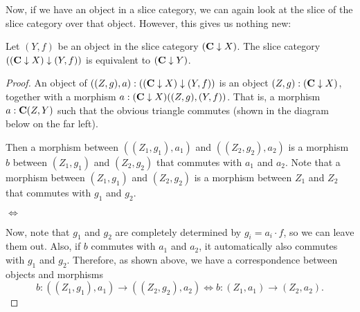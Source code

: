 Now, if we have an object in a slice category, we can again look at the slice of the slice category over that object. However, this gives us nothing new:
\begin{lemma}
  Let $ (Y, f) $ be an object in the slice category $ (\mathbf{C} \downarrow X) $. The slice category $ ((\mathbf{C} \downarrow X) \downarrow (Y, f)) $ is equivalent to $ (\mathbf{C} \downarrow Y) $.
\end{lemma}
\begin{proof}
  An object of $ ((Z, g), a) : ((\mathbf{C} \downarrow X) \downarrow (Y, f)) $ is an object $ (Z, g) : (\mathbf{C} \downarrow X) $, together with a morphism $ a: (\mathbf{C} \downarrow X)((Z, g), (Y, f)) $. That is, a morphism $ a: \mathbf{C}(Z, Y) $ such that the obvious triangle commutes (shown in the diagram below on the far left).

  Then a morphism between $ ((Z_1, g_1), a_1) $ and $ ((Z_2, g_2), a_2) $ is a morphism $ b $ between $ (Z_1, g_1) $ and $ (Z_2, g_2) $ that commutes with $ a_1 $ and $ a_2 $. Note that a morphism between $ (Z_1, g_1) $ and $ (Z_2, g_2) $ is a morphism between $ Z_1 $ and $ Z_2 $ that commutes with $ g_1 $ and $ g_2 $.
  \begin{center}
    $ \Leftrightarrow $
  \end{center}

  Now, note that $ g_1 $ and $ g_2 $ are completely determined by $ g_i = a_i \cdot f $, so we can leave them out. Also, if $ b $ commutes with $ a_1 $ and $ a_2 $, it automatically also commutes with $ g_1 $ and $ g_2 $. Therefore, as shown above, we have a correspondence between objects and morphisms
  \[ b: ((Z_1, g_1), a_1) \to ((Z_2, g_2), a_2) \Leftrightarrow b: (Z_1, a_1) \to (Z_2, a_2). \]
\end{proof}

